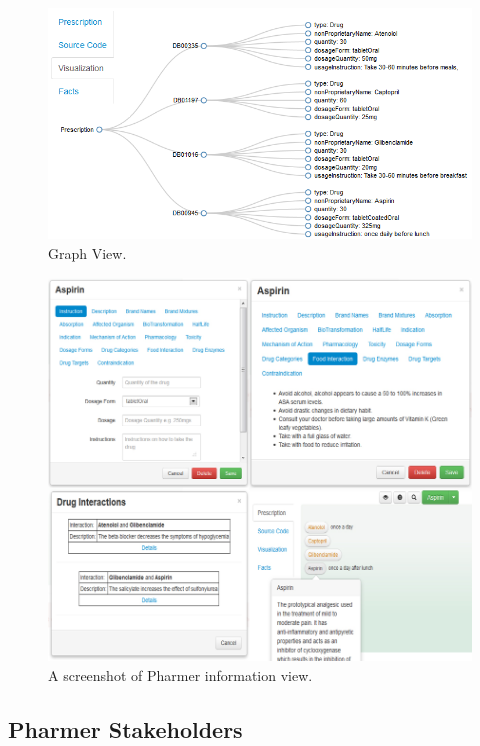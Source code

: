\documentclass[10pt, conference, compsocconf]{IEEEtran}
\begin{document}
\begin{figure}[tb]
	\centering
		\includegraphics[width=1.0\columnwidth]{images/sc2.png}
	\caption{Graph View.}
	\label{fig:graphview}
\end{figure}


\begin{figure}[tb]
	\centering
		\includegraphics[width=2.0\columnwidth]{images/screenshot1.jpg}
	\caption{A screenshot of Pharmer information view.}
	\label{fig:wysiwym}
\end{figure}

\subsection{Pharmer Stakeholders}
\label{sec:stake}
\end{document}
